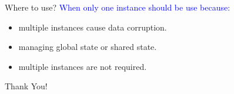 \documentclass[13pt]{beamer}
\begin{document}
\begin{frame}{Where to use?}
	\textcolor{blue}{When only one instance should be use because:}
	\begin{itemize}
		\setlength\itemsep{1em}
		\item multiple instances cause data corruption.
		\item managing global state or shared state.
		\item multiple instances are not required.
	\end{itemize}
\end{frame}

\begin{frame}
\begin{center}
{\fontsize{40}{50}\selectfont Thank You!}
\end{center}
\end{frame}
\end{document}

